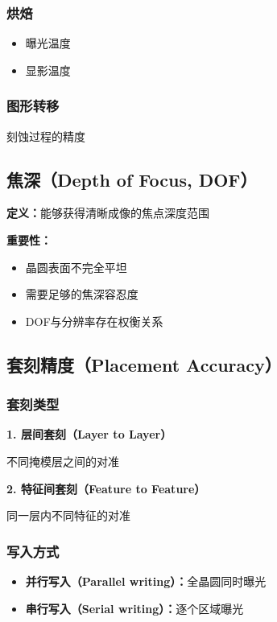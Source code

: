 \documentclass[UTF8,12pt,a4paper]{ctexart}
\begin{document}
\subsubsection{烘焙}

\begin{itemize}
    \item 曝光温度
    \item 显影温度
\end{itemize}

\subsubsection{图形转移}

刻蚀过程的精度

\subsection{焦深（Depth of Focus, DOF）}

\textbf{定义：}能够获得清晰成像的焦点深度范围

\textbf{重要性：}
\begin{itemize}
    \item 晶圆表面不完全平坦
    \item 需要足够的焦深容忍度
    \item DOF与分辨率存在权衡关系
\end{itemize}

\subsection{套刻精度（Placement Accuracy）}

\subsubsection{套刻类型}

\textbf{1. 层间套刻（Layer to Layer）}

不同掩模层之间的对准

\textbf{2. 特征间套刻（Feature to Feature）}

同一层内不同特征的对准

\subsubsection{写入方式}

\begin{itemize}
    \item \textbf{并行写入（Parallel writing）：}全晶圆同时曝光
    \item \textbf{串行写入（Serial writing）：}逐个区域曝光
\end{itemize}
\end{document}
